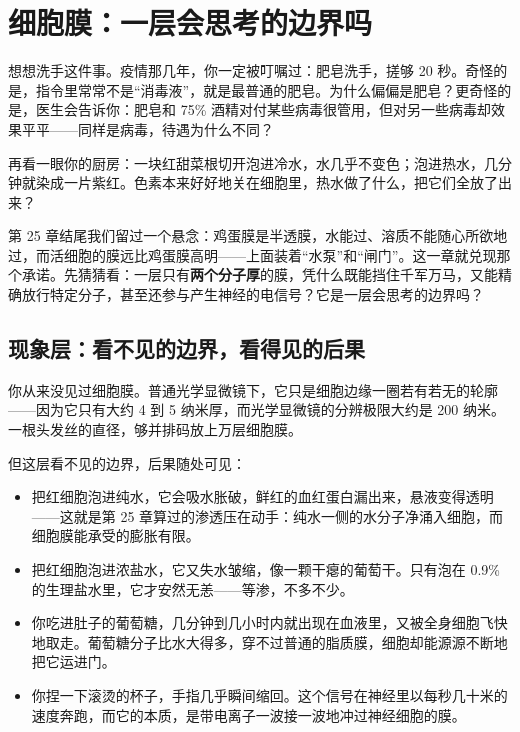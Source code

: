 \chapter{细胞膜：一层会思考的边界吗}

\begin{kaichang}
想想洗手这件事。疫情那几年，你一定被叮嘱过：肥皂洗手，搓够 20 秒。奇怪的是，指令里常常不是“消毒液”，就是最普通的肥皂。为什么偏偏是肥皂？更奇怪的是，医生会告诉你：肥皂和 75\% 酒精对付某些病毒很管用，但对另一些病毒却效果平平——同样是病毒，待遇为什么不同？

再看一眼你的厨房：一块红甜菜根切开泡进冷水，水几乎不变色；泡进热水，几分钟就染成一片紫红。色素本来好好地关在细胞里，热水做了什么，把它们全放了出来？

第 25 章结尾我们留过一个悬念：鸡蛋膜是半透膜，水能过、溶质不能随心所欲地过，而活细胞的膜远比鸡蛋膜高明——上面装着“水泵”和“闸门”。这一章就兑现那个承诺。先猜猜看：一层只有\textbf{两个分子厚}的膜，凭什么既能挡住千军万马，又能精确放行特定分子，甚至还参与产生神经的电信号？它是一层会思考的边界吗？
\end{kaichang}

\section{现象层：看不见的边界，看得见的后果}

你从来没见过细胞膜。普通光学显微镜下，它只是细胞边缘一圈若有若无的轮廓——因为它只有大约 4 到 5 纳米厚，而光学显微镜的分辨极限大约是 200 纳米。一根头发丝的直径，够并排码放上万层细胞膜。

但这层看不见的边界，后果随处可见：

\begin{itemize}[itemsep=2pt]
\item 把红细胞泡进纯水，它会吸水胀破，鲜红的血红蛋白漏出来，悬液变得透明——这就是第 25 章算过的渗透压在动手：纯水一侧的水分子净涌入细胞，而细胞膜能承受的膨胀有限。
\item 把红细胞泡进浓盐水，它又失水皱缩，像一颗干瘪的葡萄干。只有泡在 0.9\% 的生理盐水里，它才安然无恙——等渗，不多不少。
\item 你吃进肚子的葡萄糖，几分钟到几小时内就出现在血液里，又被全身细胞飞快地取走。葡萄糖分子比水大得多，穿不过普通的脂质膜，细胞却能源源不断地把它运进门。
\item 你捏一下滚烫的杯子，手指几乎瞬间缩回。这个信号在神经里以每秒几十米的速度奔跑，而它的本质，是带电离子一波接一波地冲过神经细胞的膜。
\end{itemize}


